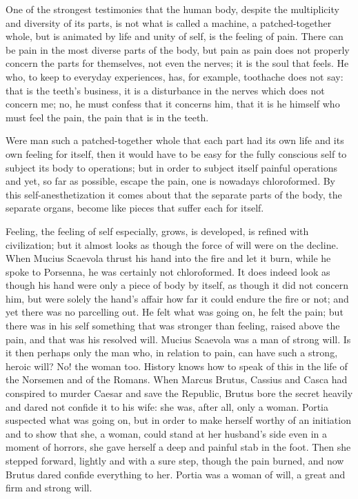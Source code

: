 \documentclass[12pt,a4paper,openany]{book}
\newcommand{\opage}[1]{\marginnote{\footnotesize\textit{[#1]}}}
\begin{document}
One of the strongest testimonies that the human
body, despite the multiplicity and diversity of its
parts, is not what is called a machine, a patched-together
whole, but is animated by life and unity of self, is the feeling
of pain. There can be pain in the most diverse parts
of the body, but pain as pain does not properly concern
the parts for themselves, not even the nerves; it is the soul
that feels. He who, to keep to everyday experiences,
has, for example, toothache does not say: that is the teeth's business, it
is a disturbance in the nerves which does not concern me; no, he
must confess that it concerns him, that it is he himself
who must feel the pain, the pain that is in the teeth.

Were man such a patched-together whole that
each part had its own life and its own feeling for itself,
then it would have to be easy for the fully conscious self to subject
its body to operations; but in order to subject itself
\setcounter{footnote}{0}%
\opage{13}painful operations and yet, so far as possible, escape
the pain, one is nowadays chloroformed. By
this self-anesthetization it comes about that the separate parts of the body,
the separate organs, become like pieces that suffer each
for itself.

Feeling, the feeling of self especially, grows, is developed, is refined
with civilization; but it almost looks as though
the force of will were on the decline. When Mucius Scaevola thrust his hand
into the fire and let it burn, while he spoke to Porsenna,
he was certainly not chloroformed. It does indeed look
as though his hand were only a piece of body by itself,
as though it did not concern him, but were solely the hand's affair
how far it could endure the fire or not; and yet there was
no parcelling out. He felt what was going on, he felt
the pain; but there was in his self something that was
stronger than feeling, raised above the pain, and that was his
resolved will. Mucius Scaevola was a man of strong
will. Is it then perhaps only the man who, in relation to
pain, can have such a strong, heroic will? No!
the woman too. History knows how to speak of this in the life of
the Norsemen and of the Romans. When Marcus Brutus, Cassius and Casca
had conspired to murder Caesar and save the Republic,
Brutus bore the secret heavily and dared not
confide it to his wife: she was, after all, only a woman.
Portia suspected what was going on, but in order to make herself worthy
of an initiation and to show that she, a woman, could stand at
her husband's side even in a moment of horrors, she gave herself
a deep and painful stab in the foot. Then she stepped forward,
lightly and with a sure step, though the pain burned, and now
Brutus dared confide everything to her. Portia was a woman of
will, a great and firm and strong will.
\end{document}
